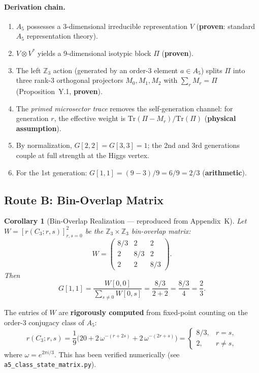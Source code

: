 \documentclass[11pt]{article}
\newtheorem{corollary}[theorem]{Corollary}
\theoremstyle{definition}
\begin{document}
\paragraph{Derivation chain.}
\begin{enumerate}
\item $A_5$ possesses a 3-dimensional irreducible representation $V$ (\textbf{proven}: standard $A_5$ representation theory).
\item $V \otimes V^*$ yields a 9-dimensional isotypic block $\Pi$ (\textbf{proven}).
\item The left $\mathbb{Z}_3$ action (generated by an order-3 element $a \in A_5$) splits $\Pi$ into three rank-3 orthogonal projectors $M_0, M_1, M_2$ with $\sum_r M_r = \Pi$ (Proposition~Y.1, \textbf{proven}).
\item The \emph{primed microsector trace} removes the self-generation channel: for generation $r$, the effective weight is $\mathrm{Tr}(\Pi - M_r)/\mathrm{Tr}(\Pi)$ (\textbf{physical assumption}).
\item By normalization, $G[2,2] = G[3,3] = 1$; the 2nd and 3rd generations couple at full strength at the Higgs vertex.
\item For the 1st generation: $G[1,1] = (9-3)/9 = 6/9 = 2/3$ (\textbf{arithmetic}).
\end{enumerate}

\subsection{Route B: Bin-Overlap Matrix}

\begin{corollary}[Bin-Overlap Realization --- reproduced from Appendix~K]
Let $W = [r(C_3; r, s)]_{r,s=0}^{2}$ be the $\mathbb{Z}_3 \times \mathbb{Z}_3$ bin-overlap matrix:
\begin{equation}
W = \begin{pmatrix} 8/3 & 2 & 2 \\ 2 & 8/3 & 2 \\ 2 & 2 & 8/3 \end{pmatrix}.
\end{equation}
Then
\begin{equation}
G[1,1] = \frac{W[0,0]}{\displaystyle\sum_{s \neq 0} W[0,s]} = \frac{8/3}{2+2} = \frac{8/3}{4} = \frac{2}{3}.
\end{equation}
\end{corollary}

The entries of $W$ are \textbf{rigorously computed} from fixed-point counting on the order-3 conjugacy class of $A_5$:
\begin{equation}
r(C_3; r, s) = \frac{1}{9}\Big(20 + 2\,\omega^{-(r+2s)} + 2\,\omega^{-(2r+s)}\Big)
= \begin{cases} 8/3, & r = s, \\ 2, & r \neq s, \end{cases}
\end{equation}
where $\omega = e^{2\pi i/3}$. This has been verified numerically (see \texttt{a5\_class\_state\_matrix.py}).
\end{document}
